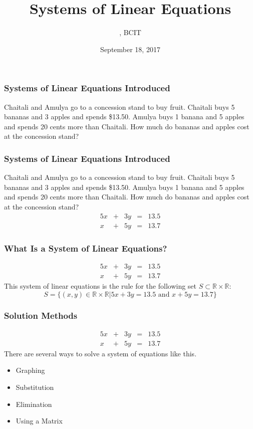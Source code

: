 \documentclass[xcolor=dvipsnames]{beamer}
\title{Systems of Linear Equations}
\subtitle{{\CourseNumber}, BCIT}
\author{\CourseName}
\date{September 18, 2017}
\begin{document}
\begin{frame}
  \titlepage
\end{frame}

\begin{frame}
  \frametitle{Systems of Linear Equations Introduced}
  Chaitali and Amulya go to a concession stand to buy fruit. Chaitali
  buys 5 bananas and 3 apples and spends \$13.50. Amulya buys 1 banana
  and 5 apples and spends 20 cents more than Chaitali. How much do
  bananas and apples cost at the concession stand?
\end{frame}

\begin{frame}
  \frametitle{Systems of Linear Equations Introduced}
  Chaitali and Amulya go to a concession stand to buy fruit. Chaitali
  buys 5 bananas and 3 apples and spends \$13.50. Amulya buys 1 banana
  and 5 apples and spends 20 cents more than Chaitali. How much do
  bananas and apples cost at the concession stand?
  \begin{equation}
    \label{eq:mohloogh}
    \begin{array}{rcrcl}
      5x&+&3y&=&13.5 \\
      x&+&5y&=&13.7
    \end{array}
  \end{equation}
\end{frame}

\begin{frame}
  \frametitle{What Is a System of Linear Equations?}
  \begin{equation}
    \label{eq:xaigeeke}
    \begin{array}{rcrcl}
      5x&+&3y&=&13.5 \\
      x&+&5y&=&13.7
    \end{array}
  \end{equation}
  This system of linear equations is the rule for the following set $S\subset\mathbb{R}\times\mathbb{R}$:
  \begin{equation}
    \label{eq:ahshohwa}
S=\{(x,y)\in\mathbb{R}\times\mathbb{R}|5x+3y=13.5\mbox{ and }x+5y=13.7\}
  \end{equation}
\end{frame}

\begin{frame}
  \frametitle{Solution Methods}
  \begin{equation}
    \label{eq:yeghahpi}
    \begin{array}{rcrcl}
      5x&+&3y&=&13.5 \\
      x&+&5y&=&13.7
    \end{array}
  \end{equation}
There are several ways to solve a system of equations like this. 
\begin{itemize}
\item Graphing
\item Substitution
\item Elimination
\item Using a Matrix
\end{itemize}
\end{frame}
\end{document}
